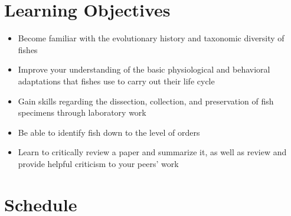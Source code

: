\documentclass[letterpaper]{inzane_syllabus} %
\begin{document}
\vspace{0.5cm}
\section{Learning Objectives}

\begin{itemize}
\item Become familiar with the evolutionary history and taxonomic diversity of fishes
\item Improve your understanding of the basic physiological and behavioral adaptations that fishes use to carry out their life cycle
\item Gain skills regarding the dissection, collection, and preservation of fish specimens through laboratory work
\item Be able to identify fish down to the level of orders
\item Learn to critically review a paper and summarize it, as well as review and provide helpful criticism to your peers' work

\end{itemize}



\newpage %

\makesecond %

\section{Schedule}


\end{document}
